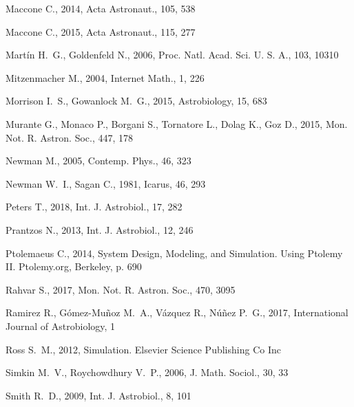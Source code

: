 \documentclass[crop]{CSLB}
\begin{document}
\begin{thebibliography}{90}
Maccone C., 2014{}, Acta Astronaut., 105, 538

Maccone C., 2015, Acta Astronaut., 115, 277

Mart{\'{i}}n H.~G., Goldenfeld N., 2006, Proc. Natl. Acad. Sci. U. S. A., 103,
  10310

Mitzenmacher M., 2004, Internet Math., 1, 226

Morrison I.~S., Gowanlock M.~G., 2015, Astrobiology, 15, 683

Murante G., Monaco P., Borgani S., Tornatore L., Dolag K., Goz D., 2015, Mon.
  Not. R. Astron. Soc., 447, 178

Newman M., 2005, Contemp. Phys., 46, 323

Newman W.~I., Sagan C., 1981, Icarus, 46, 293

Peters T., 2018, Int. J. Astrobiol., 17, 282

Prantzos N., 2013, Int. J. Astrobiol., 12, 246

Ptolemaeus C., 2014, {System Design, Modeling, and Simulation. Using Ptolemy
  II}. Ptolemy.org, Berkeley, p. 690

Rahvar S., 2017, Mon. Not. R. Astron. Soc., 470, 3095

Ramirez R., G{\'{o}}mez-Mu{\~{n}}oz M.~A., V{\'{a}}zquez R., N{\'{u}}{\~{n}}ez
  P.~G., 2017, International Journal of Astrobiology, 1

Ross S.~M., 2012, {Simulation}. Elsevier Science Publishing Co Inc

Simkin M.~V., Roychowdhury V.~P., 2006, J. Math. Sociol., 30, 33

Smith R.~D., 2009, Int. J. Astrobiol., 8, 101


\end{thebibliography}
\end{document}
